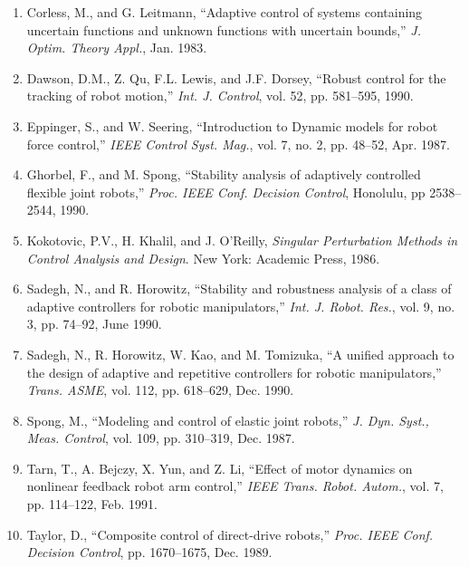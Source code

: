 \documentclass[UTF8]{ctexart}
\begin{document}
\begin{enumerate}
\item[{[1]}] Corless, M., and G. Leitmann, ``Adaptive control of systems containing uncertain functions and unknown functions with uncertain bounds,'' \textit{J. Optim. Theory Appl.}, Jan. 1983.

\item[{[2]}] Dawson, D.M., Z. Qu, F.L. Lewis, and J.F. Dorsey, ``Robust control for the tracking of robot motion,'' \textit{Int. J. Control}, vol. 52, pp. 581--595, 1990.

\item[{[3]}] Eppinger, S., and W. Seering, ``Introduction to Dynamic models for robot force control,'' \textit{IEEE Control Syst. Mag.}, vol. 7, no. 2, pp. 48--52, Apr. 1987.

\item[{[4]}] Ghorbel, F., and M. Spong, ``Stability analysis of adaptively controlled flexible joint robots,'' \textit{Proc. IEEE Conf. Decision Control}, Honolulu, pp 2538--2544, 1990.

\item[{[5]}] Kokotovic, P.V., H. Khalil, and J. O'Reilly, \textit{Singular Perturbation Methods in Control Analysis and Design}. New York: Academic Press, 1986.

\item[{[6]}] Sadegh, N., and R. Horowitz, ``Stability and robustness analysis of a class of adaptive controllers for robotic manipulators,'' \textit{Int. J. Robot. Res.}, vol. 9, no. 3, pp. 74--92, June 1990.

\item[{[7]}] Sadegh, N., R. Horowitz, W. Kao, and M. Tomizuka, ``A unified approach to the design of adaptive and repetitive controllers for robotic manipulators,'' \textit{Trans. ASME}, vol. 112, pp. 618--629, Dec. 1990.

\item[{[8]}] Spong, M., ``Modeling and control of elastic joint robots,'' \textit{J. Dyn. Syst., Meas. Control}, vol. 109, pp. 310--319, Dec. 1987.

\item[{[9]}] Tarn, T., A. Bejczy, X. Yun, and Z. Li, ``Effect of motor dynamics on nonlinear feedback robot arm control,'' \textit{IEEE Trans. Robot. Autom.}, vol. 7, pp. 114--122, Feb. 1991.

\item[{[10]}] Taylor, D., ``Composite control of direct-drive robots,'' \textit{Proc. IEEE Conf. Decision Control}, pp. 1670--1675, Dec. 1989.
\end{enumerate}
\end{document}
